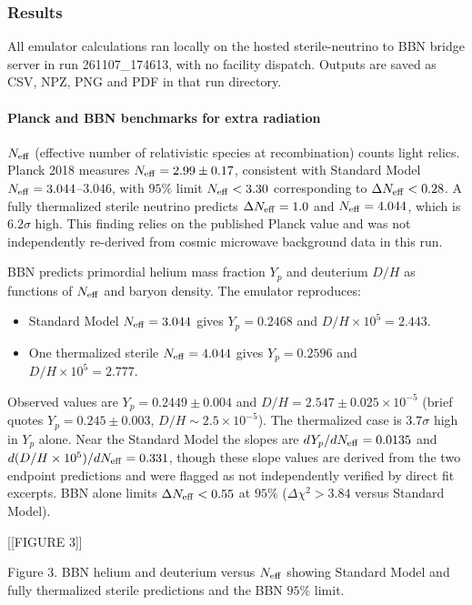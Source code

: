 \documentclass[11pt,a4paper]{article}
\begin{document}
\subsubsection*{Results}
All emulator calculations ran locally on the hosted sterile-neutrino to BBN bridge server in run 261107\_174613, with no facility dispatch. Outputs are saved as CSV, NPZ, PNG and PDF in that run directory.

\paragraph{Planck and BBN benchmarks for extra radiation}
$N_{\rm eff}$ (effective number of relativistic species at recombination) counts light relics. Planck 2018 measures $N_{\rm eff} = 2.99 \pm 0.17$, consistent with Standard Model $N_{\rm eff} = 3.044$--$3.046$, with $95\%$ limit $N_{\rm eff} < 3.30$ corresponding to $\Delta N_{\rm eff} < 0.28$. A fully thermalized sterile neutrino predicts $\Delta N_{\rm eff} = 1.0$ and $N_{\rm eff} = 4.044$, which is $6.2\sigma$ high. This finding relies on the published Planck value and was not independently re-derived from cosmic microwave background data in this run.

BBN predicts primordial helium mass fraction $Y_p$ and deuterium $D/H$ as functions of $N_{\rm eff}$ and baryon density. The emulator reproduces:

\begin{itemize}
  \item Standard Model $N_{\rm eff} = 3.044$ gives $Y_p = 0.2468$ and $D/H \times 10^5 = 2.443$.
  \item One thermalized sterile $N_{\rm eff} = 4.044$ gives $Y_p = 0.2596$ and $D/H \times 10^5 = 2.777$.
\end{itemize}
Observed values are $Y_p = 0.2449 \pm 0.004$ and $D/H = 2.547 \pm 0.025 \times 10^{-5}$ (brief quotes $Y_p = 0.245 \pm 0.003$, $D/H \sim 2.5 \times 10^{-5}$). The thermalized case is $3.7\sigma$ high in $Y_p$ alone. Near the Standard Model the slopes are $dY_p/dN_{\rm eff} = 0.0135$ and $d(D/H \times 10^5)/dN_{\rm eff} = 0.331$, though these slope values are derived from the two endpoint predictions and were flagged as not independently verified by direct fit excerpts. BBN alone limits $\Delta N_{\rm eff} < 0.55$ at $95\%$ ($\Delta \chi^2 > 3.84$ versus Standard Model).


[[FIGURE 3]]

Figure 3. BBN helium and deuterium versus $N_{\rm eff}$ showing Standard Model and fully thermalized sterile predictions and the BBN $95\%$ limit.
\end{document}
